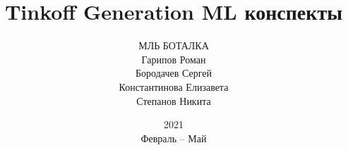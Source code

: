 \documentclass[12pt, a4paper]{article}
\title{Tinkoff Generation ML конспекты}
\date{2021\\ Февраль -- Май}
\author{МЛЬ БОТАЛКА \\ Гарипов Роман\\ Бородачев Сергей \\ Константинова Елизавета \\ Степанов Никита}
\begin{document}
\maketitle

\tableofcontents{}

\Large
\newpage{}

\newpage{}

\newpage{}

\newpage{}

\newpage{}

\newpage{}

\newpage{}

\newpage{}

\newpage{}

\newpage{}

\newpage{}

\newpage{}

\newpage{}

\end{document}
